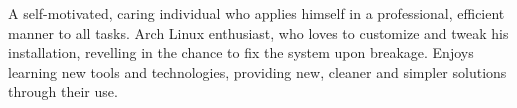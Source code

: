 

\begin{cvparagraph}

A self-motivated, caring individual who applies himself in a professional, efficient manner to all tasks. Arch Linux enthusiast, who loves to customize and tweak his installation, revelling in the chance to fix the system upon breakage. Enjoys learning new tools and technologies, providing new, cleaner and simpler solutions through their use.
\end{cvparagraph}
